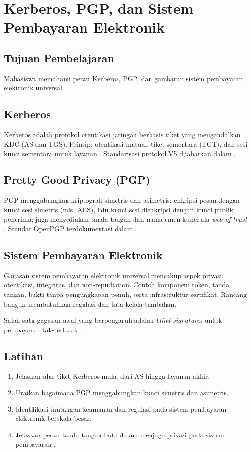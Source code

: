 \documentclass[../main.tex]{subfiles}
\begin{document}
\chapter{Kerberos, PGP, dan Sistem Pembayaran Elektronik}

\section{Tujuan Pembelajaran}
Mahasiswa memahami peran Kerberos, PGP, dan gambaran sistem pembayaran elektronik universal.

\section{Kerberos}
Kerberos adalah protokol otentikasi jaringan berbasis tiket yang mengandalkan KDC (AS dan TGS). Prinsip: otentikasi mutual, tiket sementara (TGT), dan sesi kunci sementara untuk layanan \citep{kerberos,stallings}. Standarisasi protokol V5 dijabarkan dalam \citep{rfc4120}.

\section{Pretty Good Privacy (PGP)}
PGP menggabungkan kriptografi simetris dan asimetris: enkripsi pesan dengan kunci sesi simetris (mis. AES), lalu kunci sesi dienkripsi dengan kunci publik penerima; juga menyediakan tanda tangan dan manajemen kunci ala \emph{web of trust} \citep{pgp,stallings}. Standar OpenPGP terdokumentasi dalam \citep{rfc4880}.

\section{Sistem Pembayaran Elektronik}
Gagasan sistem pembayaran elektronik universal mencakup aspek privasi, otentikasi, integritas, dan non-repudiation. Contoh komponen: token, tanda tangan, bukti tanpa pengungkapan penuh, serta infrastruktur sertifikat. Rancang bangun membutuhkan regulasi dan tata kelola tambahan.

Salah satu gagasan awal yang berpengaruh adalah \emph{blind signatures} untuk pembayaran tak-terlacak \citep{chaum_blind}.

\section{Latihan}
\begin{enumerate}
  \item Jelaskan alur tiket Kerberos mulai dari AS hingga layanan akhir.
  \item Uraikan bagaimana PGP menggabungkan kunci simetris dan asimetris.
  \item Identifikasi tantangan keamanan dan regulasi pada sistem pembayaran elektronik berskala besar.
  \item Jelaskan peran tanda tangan buta dalam menjaga privasi pada sistem pembayaran \citep{chaum_blind}.
\end{enumerate}
\end{document}

